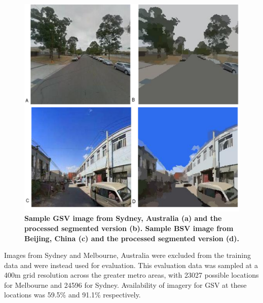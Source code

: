 \documentclass[10pt,letterpaper]{article}
\begin{document}
\begin{figure}[!htbp]
\includegraphics[scale=0.3]{Images/PlosOne/Fig4.png} 
\caption{\bf Sample GSV image from Sydney, Australia (a) \cite{GoogleMaps2017b} and the processed segmented version (b). Sample BSV image from Beijing, China (c) \cite{Baidu2017} and the processed segmented version (d).}    
 \label{fig:gsvbsv}  
\end{figure} 


Images from Sydney and Melbourne, Australia were excluded from the training data and were instead used for evaluation. This evaluation data was sampled at a 400m grid resolution across the greater metro areas, with 23027 possible locations for Melbourne and 24596 for Sydney. Availability of imagery for GSV at these locations was 59.5\% and 91.1\% respectively. 
\end{document}
